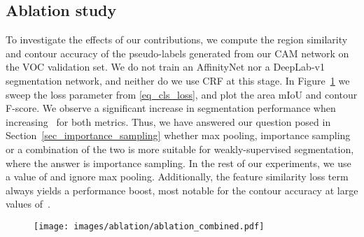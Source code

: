\documentclass{article}
\begin{document}
\subsection{Ablation study}
\label{sec_ablation_study}

To investigate the effects of our contributions, we compute the region similarity and contour accuracy of the pseudo-labels generated from our CAM network on the VOC validation set. We do not train an AffinityNet nor a DeepLab-v1 segmentation network, and neither do we use CRF at this stage. In Figure~\ref{fig_ablation} we sweep the loss parameter  from \eqref{eq_cls_loss}, and plot the area mIoU and contour F-score. We observe a significant increase in segmentation performance when increasing~ for both metrics. Thus, we have answered our question posed in Section~\ref{sec_importance_sampling} whether max pooling, importance sampling or a combination of the two is more suitable for weakly-supervised segmentation, where the answer is importance sampling. In the rest of our experiments, we use a value of  and ignore max pooling. Additionally, the feature similarity loss term always yields a performance boost, most notable for the contour accuracy at large values of~.

\begin{figure}[p]
	\setlength\abovecaptionskip{-1pt}
	\centering
	\texttt{[image: images/ablation/ablation\_combined.pdf]}
	\label{fig_ablation}
\end{figure}
\end{document}
